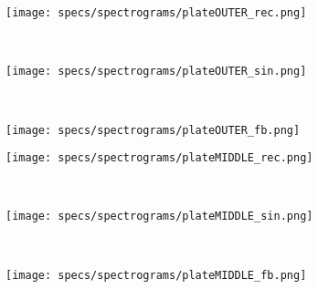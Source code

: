 \begin{figure}[H]
    \centering
    \begin{subfigure}[b]{0.25\textwidth}
        \texttt{[image: specs/spectrograms/plateOUTER\_rec.png]}
    \end{subfigure}%
    ~ %
    \begin{subfigure}[b]{0.25\textwidth}
        \texttt{[image: specs/spectrograms/plateOUTER\_sin.png]}
    \end{subfigure}%
    ~ %
    \begin{subfigure}[b]{0.25\textwidth}
        \texttt{[image: specs/spectrograms/plateOUTER\_fb.png]}
    \end{subfigure}%
      
    \begin{subfigure}[b]{0.25\textwidth}
        \texttt{[image: specs/spectrograms/plateMIDDLE\_rec.png]}
    \end{subfigure}%
    ~ %
    \begin{subfigure}[b]{0.25\textwidth}
        \texttt{[image: specs/spectrograms/plateMIDDLE\_sin.png]}
    \end{subfigure}%
    ~ %
    \begin{subfigure}[b]{0.25\textwidth}
        \texttt{[image: specs/spectrograms/plateMIDDLE\_fb.png]}
    \end{subfigure}%
      

\end{figure}
